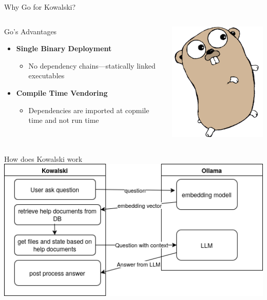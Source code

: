 \documentclass[aspectratio=169]{beamer}
\begin{document}
\begin{frame}{Why Go for Kowalski?}
\begin{columns}
\begin{block}{Go's Advantages}
\begin{itemize}
    \item \textbf{Single Binary Deployment}  
    \begin{itemize}
        \item No dependency chains—statically linked executables  
    \end{itemize}
    \item \textbf{Compile Time Vendoring}  
    \begin{itemize}
        \item Dependencies are imported at copmile time and not run time 
    \end{itemize}
\end{itemize}
\end{block}
\includegraphics[width=\linewidth]{gopher}
\end{columns}
\end{frame}

\begin{frame}{How does Kowalski work}
\includegraphics[width=\linewidth]{Flow.drawio}
\end{frame}
\end{document}
